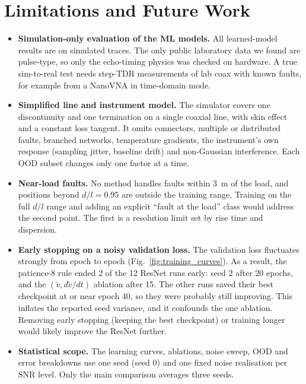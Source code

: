 \section{Limitations and Future Work}
\label{sec:limitations}
\begin{itemize}
    \item \textbf{Simulation-only evaluation of the ML models.} All learned-model results are on simulated traces. The only public laboratory data we found are pulse-type, so only the echo-timing physics was checked on hardware. A true sim-to-real test needs step-TDR measurements of lab coax with known faults, for example from a NanoVNA in time-domain mode.
    \item \textbf{Simplified line and instrument model.} The simulator covers one discontinuity and one termination on a single coaxial line, with skin effect and a constant loss tangent. It omits connectors, multiple or distributed faults, branched networks, temperature gradients, the instrument's own response (sampling jitter, baseline drift) and non-Gaussian interference. Each OOD subset changes only one factor at a time.
    \item \textbf{Near-load faults.} No method handles faults within 3~m of the load, and positions beyond $d/l = 0.95$ are outside the training range. Training on the full $d/l$ range and adding an explicit ``fault at the load'' class would address the second point. The first is a resolution limit set by rise time and dispersion.
    \item \textbf{Early stopping on a noisy validation loss.} The validation loss fluctuates strongly from epoch to epoch (Fig.~\ref{fig:training_curves}). As a result, the patience-8 rule ended 2 of the 12 ResNet runs early: seed 2 after 20 epochs, and the $(\tilde v, d\tilde v/dt)$ ablation after 15. The other runs saved their best checkpoint at or near epoch 40, so they were probably still improving. This inflates the reported seed variance, and it confounds the one ablation. Removing early stopping (keeping the best checkpoint) or training longer would likely improve the ResNet further.
    \item \textbf{Statistical scope.} The learning curves, ablations, noise sweep, OOD and error breakdowns use one seed (seed 0) and one fixed noise realisation per SNR level. Only the main comparison averages three seeds.
\end{itemize}



